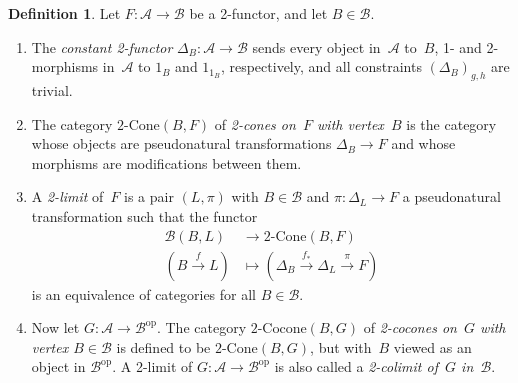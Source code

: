 \documentclass[12pt]{scrartcl}
\newcommand{\B}{\mathcal{B}}
\def\lra{\longrightarrow}
\def\lmt{\longmapsto}
\theoremstyle{definition}
\newtheorem{definition}{Definition}
\numberwithin{equation}{section}
\numberwithin{definition}{section}
\numberwithin{figure}{section}
\begin{document}
\begin{definition}
\label{def:2limit}
Let $F \colon \mathcal A \to \B$ be a 2-functor, and let $B\in\B$. 
\begin{enumerate}
\item
The \textsl{constant 2-functor} $\Delta_B \colon \mathcal A \to \B$ sends every object in~$\mathcal A$ to~$B$, 1- and 2-morphisms in~$\mathcal A$ to $1_B$ and $1_{1_B}$, respectively, and all constraints $(\Delta_B)_{g,h}$ are trivial. 
\item 
The category $2\text{-Cone}(B,F)$ of \textsl{2-cones on~$F$ with vertex~$B$} is the category whose objects are pseudonatural transformations $\Delta_B \to F$ and whose morphisms are modifications between them. 
\item 
A \textsl{2-limit} of~$F$ is a pair $(L,\pi)$ with $B\in \B$ and $\pi \colon \Delta_L \to F$ a pseudonatural transformation such that the functor
\begin{align*}
\B(B,L) 
& \lra 2\text{-Cone}(B,F) 
\\
(B \stackrel{f}{\lra} L) 
& \lmt (\Delta_B \stackrel{f_*}{\lra} \Delta_L \stackrel{\pi}{\lra} F) 
\end{align*}
is an equivalence of categories for all $B\in\B$. 
\item 
Now let $G \colon \mathcal A \to \B^{\text{op}}$. 
The category $2\text{-Cocone}(B,G)$ of \textsl{2-cocones on~$G$ with vertex $B \in \B$} is defined to be $2\text{-Cone}(B,G)$, but with~$B$ viewed as an object in $\B^{\text{op}}$. 
A 2-limit of $G \colon \mathcal A \to \B^{\text{op}}$ is also called a \textsl{2-colimit of~$G$ in~$\B$}. 
\end{enumerate}
\end{definition}
\end{document}
